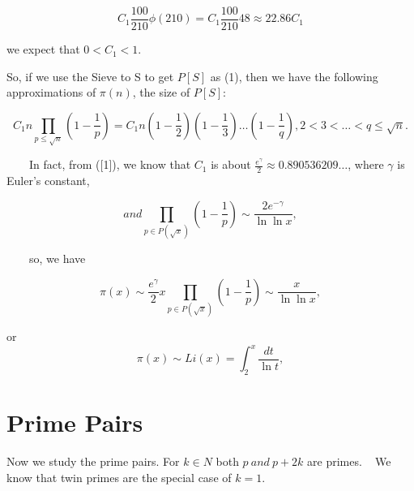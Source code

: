 \documentclass{aomart}
\begin{document}
\begin{equation}
C_{1}\frac{100}{210} \phi\left(210\right) = C_{1}\frac{100}{210} 48\approx 22.86C_{1}  
\end{equation}
\vspace{1\baselineskip}

we expect that \( 0<C_{1}<1\).
\vspace{1\baselineskip}

So, if we use the  {Sieve to S to get }\( P\left[S\right]\) { }as (1), then we have the following approximations of \( \pi\left(n\right)\), the size of \( P\left[S\right]\):

\begin{equation}
C_{1} n\prod_{p\leq\sqrt{n}}^{}\left(1-\frac{1}{p}\right) = C_{1} n\left(1-\frac{1}{2}\right)\left(1-\frac{1}{3}\right)\ldots \left(1-\frac{1}{q}\right) ,     2<3<\ldots <q\leq\sqrt{n} .  
\end{equation}

\vspace{1\baselineskip}

\ \ \ \ In fact, from ([1]), we know that \( C_{1}\) is about \(\frac{e^{\gamma }}{2}\approx 0.890536209\ldots\),  where $\gamma$ is Euler’s constant,

\begin{equation}
  and          \prod_{p\in P\left(\sqrt{x}\right)}^{}(1-\frac{1}{p} ) \sim  \frac{2e^{-\gamma }}{\ln \ln  x }  ,
\end{equation}

\vspace{1\baselineskip}

\ \ \ \ so, we have

\begin{equation}
\pi\left(x\right) \sim  \frac{e^{\gamma }}{2}  x\prod_{p\in P\left(\sqrt{x}\right)}^{}\left(1-\frac{1}{p}\right) \sim  \frac{x}{\ln \ln  x }   ,
\end{equation}
\vspace{1\baselineskip}

 or 
\begin{equation}
\pi(x) \sim Li(x) = \int_{2}^{x} \frac{dt}{\ln t},
\end{equation}

\section{Prime Pairs}



Now we study the prime pairs.
\vspace{1\baselineskip}
For \( k\in N\) both \( p \ and \ p+2k\) are primes.\textbf{\ \ }We know that twin primes are the special case of \( k = 1\).
\vspace{1\baselineskip}
\end{document}
